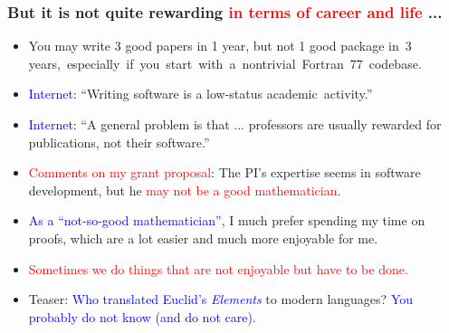 \documentclass[slidestop,mathserif,xcolor=dvipsnames]{beamer}
\newcommand{\blue}[1]{\textcolor{blue}{#1}}
\newcommand{\red}[1]{\textcolor{red}{#1}}
\begin{document}
\begin{frame}
    \frametitle{But it is not quite rewarding \red{in terms of career  and life} ...}

    \begin{itemize}
        \item You may write 3 good papers in 1 year, but not 1 good package in~3 years,~especially~if~you~start~with~a~nontrivial~Fortran~77~codebase.
            \vspace{1ex}
        \item \blue{Internet}: ``Writing software is a low-status academic~activity.''
            \vspace{1ex}
        \item \blue{Internet}: ``A general problem is that ... professors are usually rewarded for publications, not their software.''
           \vspace{1ex}
       \item \red{Comments on my grant proposal}: The PI's expertise seems in software development,
           but he \red{may not be a good mathematician}.
           \vspace{1ex}
       \item \blue{As a ``not-so-good mathematician''}, I much prefer spending my time on
           proofs, which are a lot easier and much more enjoyable for me.
    \vspace{1ex}
\item \red{Sometimes we do things that are not enjoyable but have to be done.}

    \vspace{1ex}
\item Teaser: \blue{Who translated Euclid's \textit{Elements}} to modern
    languages? \blue{You probably do not know (and do not care).}
    \end{itemize}

\end{frame}
\end{document}
